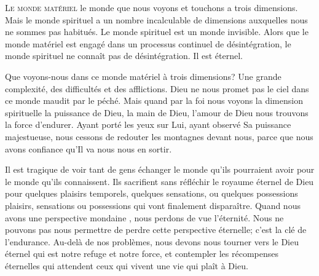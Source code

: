 



\lettrine{L}{e monde matériel}
 \ocadr le monde que nous voyons et touchons \fcadr{} a trois dimensions.
 Mais le monde spirituel a un nombre incalculable de dimensions auxquelles
 nous ne sommes pas habitués. Le monde spirituel est un monde invisible.
 Alors que le monde matériel est engagé dans un processus
 continuel de désintégration, le monde spirituel ne connaît pas
 de désintégration. Il est éternel.


Que voyons-nous dans ce monde matériel à trois dimensions?
 Une grande complexité, des difficultés et des afflictions.
 Dieu ne nous promet pas le ciel dans ce monde maudit par le péché.
 Mais quand par la foi nous voyons la dimension spirituelle
 \ocadr la puissance de Dieu, la main de Dieu, l'amour de Dieu \fcadr{}
 nous trouvons la force d'endurer. Ayant porté les yeux sur Lui,
 ayant observé Sa puissance majestueuse, nous cessons de redouter
 les montagnes devant nous, parce que nous avons confiance
 qu'Il va nous nous en sortir.

Il est tragique de voir tant de gens échanger le monde
 qu'ils pourraient 
 avoir pour le monde qu'ils connaissent.
 Ils sacrifient sans réfléchir le royaume éternel de Dieu
 pour quelques plaisirs temporels, quelques sensations, ou quelques possessions
 \ocadr plaisirs, sensations ou possessions qui vont finalement disparaître.
 Quand nous avons une perspective mondaine ,
 nous perdons de vue l'éternité. Nous ne pouvons pas nous permettre de perdre
 cette perspective éternelle; c'est la clé de l'endurance.
 Au-delà de nos problèmes, nous devons nous tourner vers le Dieu éternel
 qui est notre refuge et notre force, et contempler les récompenses
 éternelles qui attendent ceux qui vivent une vie qui plaît à Dieu.

\dvrule



